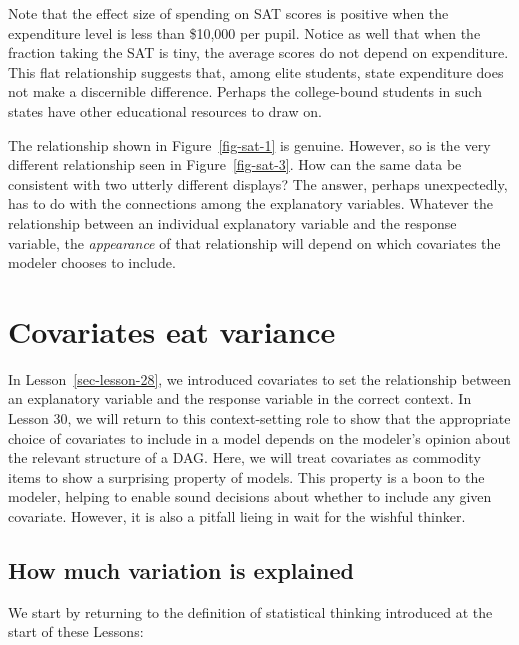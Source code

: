 \documentclass[
  letterpaper,
  DIV=11,
  numbers=noendperiod,
  oneside]{scrreprt}
\begin{document}
\begin{tcolorbox}
\begin{figure}[H]
\end{figure}

Note that the effect size of spending on SAT scores is positive when the
expenditure level is less than \$10,000 per pupil. Notice as well that
when the fraction taking the SAT is tiny, the average scores do not
depend on expenditure. This flat relationship suggests that, among elite
students, state expenditure does not make a discernible difference.
Perhaps the college-bound students in such states have other educational
resources to draw on.

The relationship shown in Figure~\ref{fig-sat-1} is genuine. However, so
is the very different relationship seen in Figure~\ref{fig-sat-3}. How
can the same data be consistent with two utterly different displays? The
answer, perhaps unexpectedly, has to do with the connections among the
explanatory variables. Whatever the relationship between an individual
explanatory variable and the response variable, the \emph{appearance} of
that relationship will depend on which covariates the modeler chooses to
include.

\end{tcolorbox}

\hypertarget{sec-lesson-29}{%
\chapter{Covariates eat variance}\label{sec-lesson-29}}

In Lesson~\ref{sec-lesson-28}, we introduced covariates to set the
relationship between an explanatory variable and the response variable
in the correct context. In Lesson 30, we will return to this
context-setting role to show that the appropriate choice of covariates
to include in a model depends on the modeler's opinion about the
relevant structure of a DAG. Here, we will treat covariates as commodity
items to show a surprising property of models. This property is a boon
to the modeler, helping to enable sound decisions about whether to
include any given covariate. However, it is also a pitfall lieing in
wait for the wishful thinker.

\hypertarget{how-much-variation-is-explained}{%
\section{How much variation is
explained}\label{how-much-variation-is-explained}}

We start by returning to the definition of statistical thinking
introduced at the start of these Lessons:
\end{document}
